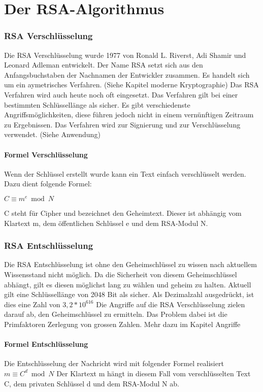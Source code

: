 \part{Der RSA-Algorithmus}



\section{RSA Verschlüsselung}
Die RSA Verschlüsselung wurde 1977 von Ronald L. Riverst, Adi Shamir und Leonard Adleman entwickelt. Der Name RSA setzt sich aus den Anfangsbuchstaben der Nachnamen der Entwickler zusammen. Es handelt sich um ein aymetrisches Verfahren. (Siehe Kapitel moderne Kryptographie) %
Das RSA Verfahren wird auch heute noch oft eingesetzt. Das Verfahren gilt bei einer bestimmten Schlüssellänge als sicher. Es gibt verschiedenste Angriffsmöglichkeiten, diese führen jedoch nicht in einem vernünftigen Zeitraum zu Ergebnissen. Das Verfahren wird zur Signierung und zur Verschlüsselung verwendet. (Siehe Anwendung) %

\subsection{Formel Verschlüsselung}
Wenn der Schlüssel erstellt wurde kann ein Text einfach verschlüsselt werden. Dazu dient folgende Formel:

$ C \equiv m^e  \bmod N $

C steht für Cipher und bezeichnet den Geheimtext. Dieser ist abhängig vom Klartext m, dem öffentlichen Schlüssel e und dem RSA-Modul N. 

\section{RSA Entschlüsselung}
Die RSA Entschlüsselung ist ohne den Geheimschlüssel zu wissen nach aktuellem Wissensstand nicht möglich. Da die Sicherheit von diesem Geheimschlüssel abhängt, gilt es diesen möglichst lang zu wählen und geheim zu halten. Aktuell gilt eine Schlüssellänge von 2048 Bit als sicher. Als Dezimalzahl ausgedrückt, ist dies eine Zahl von $ 3,2 * 10^{616} $
Die Angriffe auf die RSA Verschlüsselung zielen darauf ab, den Geheimschlüssel zu ermitteln. Das Problem dabei ist die Primfaktoren Zerlegung von grossen Zahlen. Mehr dazu im Kapitel Angriffe %

\subsection{Formel Entschlüsselung}
Die Entschlüsselung der Nachricht wird mit folgender Formel realisiert
%
$ m \equiv C^d \bmod N $
%
Der Klartext m hängt in diesem Fall vom verschlüsselten Text C, dem privaten Schlüssel d und dem RSA-Modul N ab. 
%
